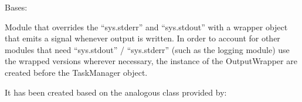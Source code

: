 \documentclass[letterpaper,10pt,english]{sphinxmanual}
\begin{document}
\begin{fulllineitems}
\label{\detokenize{gui_output_wrapper:src.graphical_user_interface.output_wrapper.OutputWrapper}}
\sphinxAtStartPar
Bases: 

\sphinxAtStartPar
Module that overrides the “sys.stderr” and “sys.stdout” with a wrapper object
that emits a signal whenever output is written. In order to account for other
modules that need “sys.stdout” / “sys.stderr” (such as the logging module) use
the wrapped versions wherever necessary, the instance of the OutputWrapper are
created before the TaskManager object.

\sphinxAtStartPar
It has been created based on the analogous
class provided by:

\begin{fulllineitems}
\label{\detokenize{gui_output_wrapper:src.graphical_user_interface.output_wrapper.OutputWrapper.__getattr__}}
\end{fulllineitems}


\begin{fulllineitems}
\label{\detokenize{gui_output_wrapper:src.graphical_user_interface.output_wrapper.OutputWrapper.__init__}}
\end{fulllineitems}


\end{fulllineitems}
\end{document}

